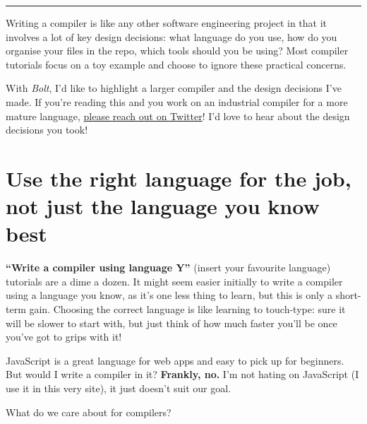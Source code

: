 \begin{center}\rule{0.5\linewidth}{0.5pt}\end{center}

Writing a compiler is like any other software engineering project in
that it involves a lot of key design decisions: what language do you
use, how do you organise your files in the repo, which tools should you
be using? Most compiler tutorials focus on a toy example and choose to
ignore these practical concerns.

With \emph{Bolt}, I'd like to highlight a larger compiler and the design
decisions I've made. If you're reading this and you work on an
industrial compiler for a more mature language,
\href{https://twitter.com/mukulrathi_}{please reach out on Twitter}! I'd
love to hear about the design decisions you took!

\hypertarget{use-the-right-language-for-the-job-not-just-the-language-you-know-best}{%
\section{\texorpdfstring{\protect\hyperlink{use-the-right-language-for-the-job-not-just-the-language-you-know-best}{}Use
the right language for the job, not just the language you know
best}{Use the right language for the job, not just the language you know best}}\label{use-the-right-language-for-the-job-not-just-the-language-you-know-best}}

\textbf{``Write a compiler using language Y''} (insert your favourite
language) tutorials are a dime a dozen. It might seem easier initially
to write a compiler using a language you know, as it's one less thing to
learn, but this is only a short-term gain. Choosing the correct language
is like learning to touch-type: sure it will be slower to start with,
but just think of how much faster you'll be once you've got to grips
with it!

JavaScript is a great language for web apps and easy to pick up for
beginners. But would I write a compiler in it? \textbf{Frankly, no.} I'm
not hating on JavaScript (I use it in this very site), it just doesn't
suit our goal.

What do we care about for compilers?


